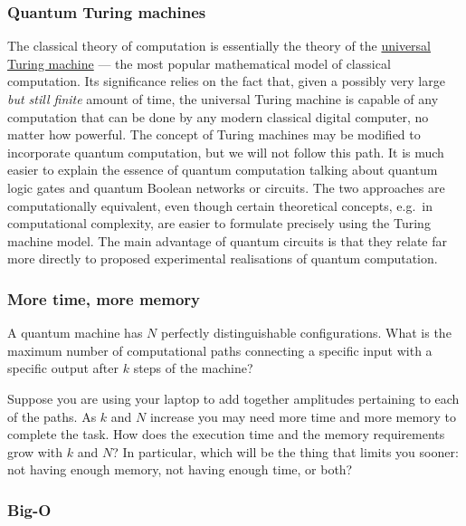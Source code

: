 \documentclass[fleqn,a4paper]{article}
\theoremstyle{definition}
\theoremstyle{definition}
\theoremstyle{definition}
\theoremstyle{definition}
\theoremstyle{remark}
\begin{document}
\hypertarget{quantum-turing-machines}{%
\subsubsection{Quantum Turing machines}\label{quantum-turing-machines}}

The classical theory of computation is essentially the theory of the \href{https://en.wikipedia.org/wiki/Universal_Turing_machine}{universal Turing machine} --- the most popular mathematical model of classical computation.
Its significance relies on the fact that, given a possibly very large \emph{but still finite} amount of time, the universal Turing machine is capable of any computation that can be done by any modern classical digital computer, no matter how powerful.
The concept of Turing machines may be modified to incorporate quantum computation, but we will not follow this path.
It is much easier to explain the essence of quantum computation talking about quantum logic gates and quantum Boolean networks or circuits.
The two approaches are computationally equivalent, even though certain theoretical concepts, e.g.~in computational complexity, are easier to formulate precisely using the Turing machine model.
The main advantage of quantum circuits is that they relate far more directly to proposed experimental realisations of quantum computation.

\hypertarget{more-time-more-memory}{%
\subsubsection{More time, more memory}\label{more-time-more-memory}}

A quantum machine has \(N\) perfectly distinguishable configurations.
What is the maximum number of computational paths connecting a specific input with a specific output after \(k\) steps of the machine?

Suppose you are using your laptop to add together amplitudes pertaining to each of the paths.
As \(k\) and \(N\) increase you may need more time and more memory to complete the task.
How does the execution time and the memory requirements grow with \(k\) and \(N\)?
In particular, which will be the thing that limits you sooner: not having enough memory, not having enough time, or both?

\hypertarget{big-o}{%
\subsubsection{Big-O}\label{big-o}}
\end{document}
